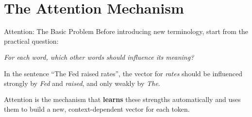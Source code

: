 \documentclass[aspectratio=169]{beamer}
\begin{document}
\section{The Attention Mechanism}
%
\begin{frame}{Attention: The Basic Problem}
  Before introducing new terminology, start from the practical question:

  \vspace{0.4em}
  \begin{center}
    \itshape For each word, which other words should influence its meaning?
  \end{center}
  \vspace{0.4em}

  In the sentence ``The Fed raised rates'', the vector for \textit{rates} should be
  influenced strongly by \textit{Fed} and \textit{raised}, and only weakly by \textit{The}.

  \vspace{0.3em}
  \begin{center}
  \end{center}

  \vspace{0.2em}
  Attention is the mechanism that \textbf{learns} these strengths automatically and uses
  them to build a new, context-dependent vector for each token.
\end{frame}
%
%
\end{document}
